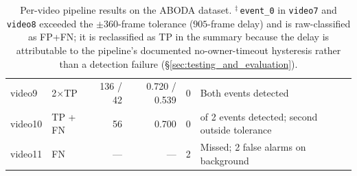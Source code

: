 \begin{table}[!htbp]
\begin{tabularx}{\textwidth}{l l r r c >{\raggedright\arraybackslash}X}
		\addlinespace
		video9         & 2$\times$TP              & 136 / 42             & 0.720 / 0.539 & 0                  & Both events detected                                                                                                       \\
		\addlinespace
		video10        & TP + FN                  & 56                   & 0.700         & 0                  & 1 of 2 events detected; second outside tolerance                                                                           \\
		\addlinespace
		video11        & FN                       & ---                  & ---           & 2                  & Missed; 2 false alarms on background                                                                                       \\
		\bottomrule
	\end{tabularx}
	\caption{Per-video pipeline results on the ABODA dataset. $^{\ddagger}$\,\texttt{event\_0} in \texttt{video7} and \texttt{video8} exceeded the $\pm 360$-frame tolerance ($905$-frame delay) and is raw-classified as FP+FN; it is reclassified as TP in the summary because the delay is attributable to the pipeline's documented no-owner-timeout hysteresis rather than a detection failure (\S\ref{sec:testing_and_evaluation}).}
	\label{tab:eval_aboda}
\end{table}

